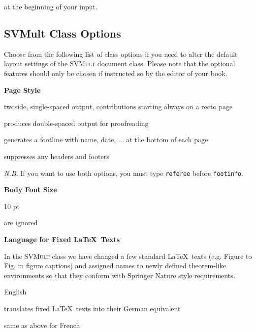 \documentclass[graybox]{svmult}
\begin{document}
\begin{refguide}
\begin{sloppy}
at the beginning of your input.

\subsection{SVMult Class Options}\label{subsec:2}
Choose from the following list of class options if you need to alter the default
layout settings of the \textsc{SVMult} document class. Please note that the
optional features should only be chosen if instructed so by the editor of your
book.


\textbf{Page Style}

\begin{description}
\item[\textit{default}] twoside, single-spaced output, contributions starting always on a recto page
\item[\textit{referee}] produces double-spaced output for proofreading
\item[\textit{footinfo}] generates a footline with name, date, $\ldots$ at the bottom of each page
\item[\textit{norunningheads}] suppresses any headers and footers
\end{description}

\textit{N.B.} If you want to use both options, you must type \texttt{referee} before \texttt{footinfo}.


\textbf{Body Font Size}

\begin{description}[\textit{11pt, 12pt}]
\item[\textit{default}] 10 pt
\item[\textit{11pt, 12pt}] are ignored
\end{description}


\textbf{Language for Fixed \LaTeX\ Texts}


In the \textsc{SVMult} class we have changed a few standard \LaTeX\ texts (e.g. Figure
to Fig. in figure captions) and assigned names to newly defined theorem-like
environments so that they conform with Springer Nature style requirements.

\begin{description}
\item[\textit{default}] English
\item[\textit{deutsch}] translates fixed \LaTeX\ texts into their German equivalent
\item[\textit{francais}] same as above for French
\end{description}



\end{sloppy}
\end{refguide}
\end{document}
